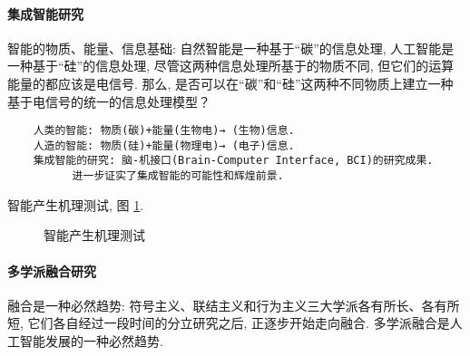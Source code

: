 \paragraph{集成智能研究}

智能的物质、能量、信息基础: 自然智能是一种基于“碳”的信息处理, 人工智能是一种基于“硅”的信息处理, 尽管这两种信息处理所基于的物质不同, 但它们的运算能量的都应该是电信号. 那么, 是否可以在“碳”和“硅”这两种不同物质上建立一种基于电信号的统一的信息处理模型？
\begin{Verbatim}
    人类的智能: 物质(碳)+能量(生物电)→ (生物)信息.
    人造的智能: 物质(硅)+能量(物理电)→ (电子)信息.
    集成智能的研究: 脑-机接口(Brain-Computer Interface, BCI)的研究成果.
          进一步证实了集成智能的可能性和辉煌前景.
\end{Verbatim}
智能产生机理测试, 图 \ref{AItest2020012801}.
\begin{figure}[htbp]
\begin{center}
\end{center}
\caption{智能产生机理测试}
\label{AItest2020012801}
\end{figure}
\paragraph{多学派融合研究}

融合是一种必然趋势: 符号主义、联结主义和行为主义三大学派各有所长、各有所短, 它们各自经过一段时间的分立研究之后, 正逐步开始走向融合. 多学派融合是人工智能发展的一种必然趋势.

